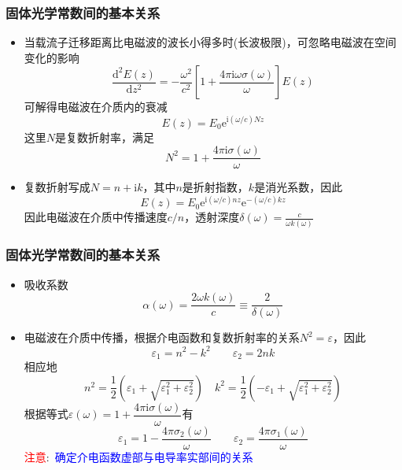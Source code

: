 \documentclass[cjk,slidestop,compress,mathserif,blue]{beamer}
\begin{document}
\frame
{
	\frametitle{固体光学常数间的基本关系}
	\begin{itemize}
		\item 当载流子迁移距离比电磁波的波长小得多时(长波极限)，可忽略电磁波在空间变化的影响
			\begin{displaymath}
				\frac{\mathrm{d}^2E(z)}{\mathrm{d}z^2}=-\frac{\omega^2}{c^2}\left[ 1+\frac{4\pi\mathrm{i}\omega\sigma(\omega)}{\omega} \right]E(z)
			\end{displaymath}
		可解得电磁波在介质内的衰减
		\begin{displaymath}
			E(z)=E_0\mathrm{e}^{\mathrm{i}(\omega/c)Nz}
		\end{displaymath}
		这里$N$是复数折射率，满足
		\begin{displaymath}
			N^2=1+\frac{4\pi\mathrm{i}\sigma(\omega)}{\omega} 
		\end{displaymath}
		\item 复数折射写成$N=n+\mathrm{i}k$，其中$n$是折射指数，$k$是消光系数，因此
			\begin{displaymath}
				E(z)=E_0\mathrm{e}^{\mathrm{i}(\omega/c)nz}\mathrm{e}^{-(\omega/c)kz}
			\end{displaymath}
			因此电磁波在介质中传播速度$c/n$，透射深度$\delta(\omega)=\frac{c}{\omega k(\omega)}$
	\end{itemize}
}

\frame
{
	\frametitle{固体光学常数间的基本关系}
	\begin{itemize}
		\item 吸收系数
			\begin{displaymath}
				\alpha(\omega)=\frac{2\omega k(\omega)}c\equiv\frac2{\delta(\omega)}
			\end{displaymath}
		\item 电磁波在介质中传播，根据介电函数和复数折射率的关系$N^2=\varepsilon$，因此
			\begin{displaymath}
				\varepsilon_1=n^2-k^2\qquad\varepsilon_2=2nk
			\end{displaymath}
			相应地
			\begin{displaymath}
				n^2=\frac12(\varepsilon_1+\sqrt{\varepsilon_1^2+\varepsilon_2^2})\quad k^2=\frac12(-\varepsilon_1+\sqrt{\varepsilon_1^2+\varepsilon_2^2})
			\end{displaymath}
			根据等式$\varepsilon(\omega)=1+\dfrac{4\pi\mathrm{i}\sigma(\omega)}{\omega}$有
			\begin{displaymath}
				\varepsilon_1=1-\frac{4\pi\sigma_2(\omega)}{\omega}\qquad\varepsilon_2=\frac{4\pi\sigma_1(\omega)}{\omega} 
			\end{displaymath}
			\textcolor{red}{注意}:~\textcolor{blue}{确定介电函数虚部与电导率实部间的关系}
	\end{itemize}
}
\end{document}
